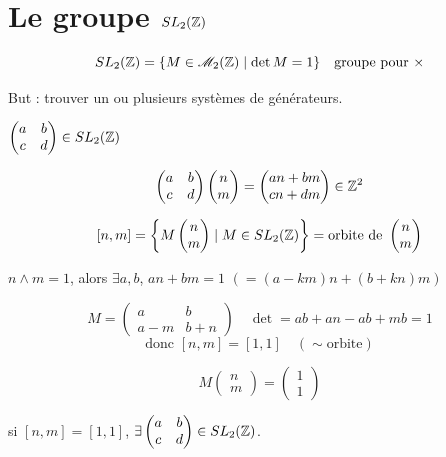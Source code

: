 \section{Le groupe \texorpdfstring{$SL_2(\mathbb{Z})$}{SL2(Z)}}

\[ SL_2(\mathbb{Z}) = \{ M \in \mathscr M_2(\mathbb{Z}) \mid \det M = 1 \} \quad \text{groupe pour } \times \]

But : trouver un ou plusieurs systèmes de générateurs.

 $\begin{pmatrix} a & b \\ c & d \end{pmatrix} \in SL_2(\mathbb{Z})$

\[
    \begin{pmatrix} a & b \\ c & d \end{pmatrix} \begin{pmatrix} n \\ m \end{pmatrix} = \begin{pmatrix} an+bm \\ cn+dm \end{pmatrix} \in \mathbb{Z}^2
\]

\[ [n, m] = \left\{ M \begin{pmatrix} n \\ m \end{pmatrix} \mid M \in SL_2(\mathbb{Z}) \right\} = \text{orbite de } \begin{pmatrix} n \\ m \end{pmatrix} \]

 $n \wedge m = 1$, alors $\exists a, b$, $an + bm = 1$ $(= (a-km)n + (b+kn)m)$

\[
    M = \begin{pmatrix} a & b \\ a-m & b+n \end{pmatrix} \quad \det = ab + an - ab + mb = 1
\]
\[
    \text{donc } [n, m] = [1, 1] \quad (\sim \text{orbite})
\]

\[
    M \begin{pmatrix} n \\ m \end{pmatrix} = \begin{pmatrix} 1 \\ 1 \end{pmatrix}
\]

 si $[n, m] = [1, 1]$, $\exists \begin{pmatrix} a & b \\ c & d \end{pmatrix} \in SL_2(\mathbb{Z})$.

